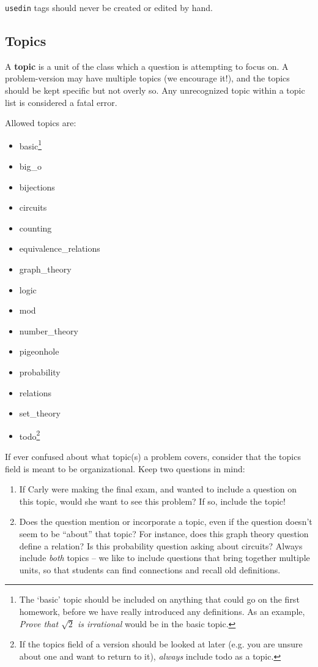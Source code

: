     \texttt{usedin} tags should never be created or edited by hand.
  
  \subsection{Topics}
    A \textbf{topic} is a unit of the class which a question is attempting 
    to focus on. A problem-version may have multiple topics (we encourage 
    it!), and the topics should be kept specific but not overly so. Any 
    unrecognized topic within a topic list is considered a fatal error.
    
    Allowed topics are:
    \begin{itemize}\itemsep0pt
      \item basic\footnote{The `basic' topic should be included on 
      anything that could go on the first homework, before we have really 
      introduced any definitions. As an example, \textit{Prove that $\sqrt 
      2$ is irrational} would be in the basic topic.}
      \item big\_o
      \item bijections
      \item circuits
      \item counting
      \item equivalence\_relations
      \item graph\_theory
      \item logic
      \item mod
      \item number\_theory
      \item pigeonhole
      \item probability
      \item relations
      \item set\_theory
      \item todo\footnote{If the topics field of a version should be 
      looked at later (e.g. you are unsure about one and want to return to 
      it), \textit{always} include todo as a topic.}
    \end{itemize}
    
    If ever confused about what topic(s) a problem covers, consider that 
    the topics field is meant to be organizational. Keep two questions in mind:
    
    \begin{enumerate}[1.]\itemsep0pt
      \item If Carly were making the final exam, and wanted to include a 
      question on this topic, would she want to see this problem? If so, 
      include the topic!
      \item Does the question mention or incorporate a topic, even if the 
      question doesn't seem to be ``about'' that topic? For instance, does 
      this graph theory question define a relation? Is this probability 
      question asking about circuits? Always include \textit{both} topics 
      -- we like to include questions that bring together multiple units, 
      so that students can find connections and recall old definitions.
    \end{enumerate}
  
